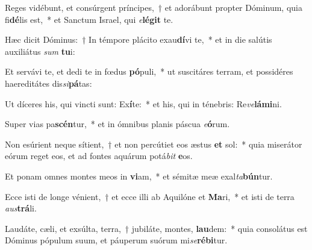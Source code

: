 \item Reges vidébunt, et consúrgent príncipes,~† et adorábunt propter Dóminum, quia fi\textbf{dé}lis est,~* et Sanctum Israel, qui \textit{e}\textbf{lé}\textbf{git} te.
\item Hæc dicit Dóminus:~† In témpore plácito exau\textbf{dí}vi te,~* et in die salútis auxiliátus \textit{sum} \textbf{tu}i:
\item Et servávi te, et dedi te in fœdus \textbf{pó}puli,~* ut suscitáres terram, et possidéres haereditátes dis\textit{si}\textbf{pá}tas:
\item Ut díceres his, qui vincti sunt: Ex\textbf{í}te:~* et his, qui in ténebris: Re\textit{ve}\textbf{lá}\textbf{mi}ni.
\item Super vias pa\textbf{scén}tur,~* et in ómnibus planis páscua \textit{e}\textbf{ó}rum.
\item Non esúrient neque sítient,~† et non percútiet eos æstus \textbf{et} sol:~* quia miserátor eórum reget eos, et ad fontes aquárum potá\textit{bit} \textbf{e}os.
\item Et ponam omnes montes meos in \textbf{vi}am,~* et sémitæ meæ exal\textit{ta}\textbf{bún}tur.
\item Ecce isti de longe vénient,~† et ecce illi ab Aquilóne et \textbf{Ma}ri,~* et isti de terra \textit{aus}\textbf{trá}li.
\item Laudáte, cæli, et exsúlta, terra,~† jubiláte, montes, \textbf{lau}dem:~* quia consolátus est Dóminus pópulum suum, et páuperum suórum mi\textit{se}\textbf{ré}\textbf{bi}tur.
